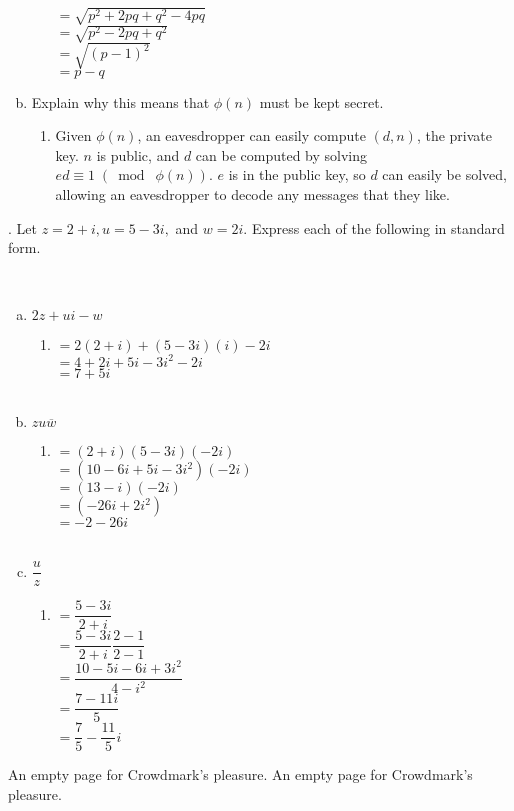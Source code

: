 \documentclass{letter}
\begin{document}
\begin{enumerate}[(a)]
\begin{minipage}[t]{0.5\textwidth}
\begin{itemize}
			$= \sqrt{p^2 + 2pq + q^2 - 4pq}$\\
			$= \sqrt{p^2 -2pq + q^2}$\\
			$= \sqrt{(p-1)^2}$\\
			$= p - q$\\
		\end{itemize}
	\end{minipage}
	\item Explain why this means that $\phi (n)$ must be kept secret.\\
	\begin{enumerate}[ ]
		\item Given $\phi(n)$, an eavesdropper can easily compute $(d, n)$, the private key. $n$ is public, and $d$ can be computed by solving $ed \equiv 1\;(\bmod\; \phi (n))$. $e$ is in the public key, so $d$ can easily be solved, allowing an eavesdropper to decode any messages that they like.
	\end{enumerate}
\end{enumerate}
. Let $z=2 + i, u = 5 - 3i,$ and $w = 2i$. Express each of the following in standard form.

\hrulefill\\
\begin{enumerate}[(a)]
	\item $2z + ui - w$
	\begin{enumerate}[ ]
		\item $= 2(2+i) + (5-3i)(i) - 2i$\\
		$= 4 + 2i + 5i - 3i^2 - 2i$\\
		$= 7 + 5i$\\\\
	\end{enumerate}
	\item $zu\overline{w}$
	\begin{enumerate}[ ]
		\item $= (2+i)(5-3i)(-2i)$\\
		$= (10 - 6i + 5i - 3i^2)(-2i)$\\
		$= (13 - i)(-2i)$\\
		$= (-26i + 2i^2)$\\
		$= -2 - 26i$\\\\
	\end{enumerate}
	\item $\dfrac{u}{z}$
	\begin{enumerate}[ ]
		\item $= \dfrac{5-3i}{2+i}$\\
		$= \dfrac{5-3i}{2+i} \dfrac{2-1}{2-1}$\\
		$= \dfrac{10 - 5i - 6i + 3i^2}{4-i^2}$\\
		$= \dfrac{7 - 11i}{5}$\\
		$= \dfrac{7}{5} - \dfrac{11}{5} i$
	\end{enumerate}
\end{enumerate}

\clearpage
An empty page for Crowdmark's pleasure.
\clearpage
An empty page for Crowdmark's pleasure.
\end{document}
